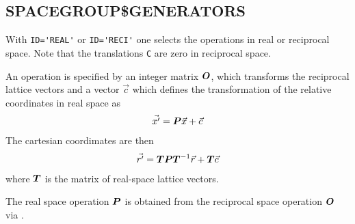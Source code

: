 \documentclass[11pt,a4paper]{report}
\begin{document}
\subsection{SPACEGROUP\$GENERATORS}
With \verb|ID='REAL'| or \verb|ID='RECI'| one selects the operations
in real or reciprocal space. Note that the translations \verb|C| are
zero in reciprocal space.

An operation is specified by an integer matrix $\bm{O}$, which
transforms the reciprocal lattice vectors and a vector $\vec{c}$ which
defines the transformation of the relative coordinates in real space
as
\begin{eqnarray}
\vec{x'}=\bm{P}\vec{x}+\vec{c}
\end{eqnarray}
The cartesian coordimates are then
\begin{eqnarray}
\vec{r'}=\bm{T}\bm{P}\bm{T}^{-1}\vec{r}+\bm{T}\vec{c}
\end{eqnarray}
where $\bm{T}$ is the matrix of real-space lattice vectors.

The real space operation $\bm{P}$ is obtained from the reciprocal
space operation $\bm{O}$ via .






\end{document}
